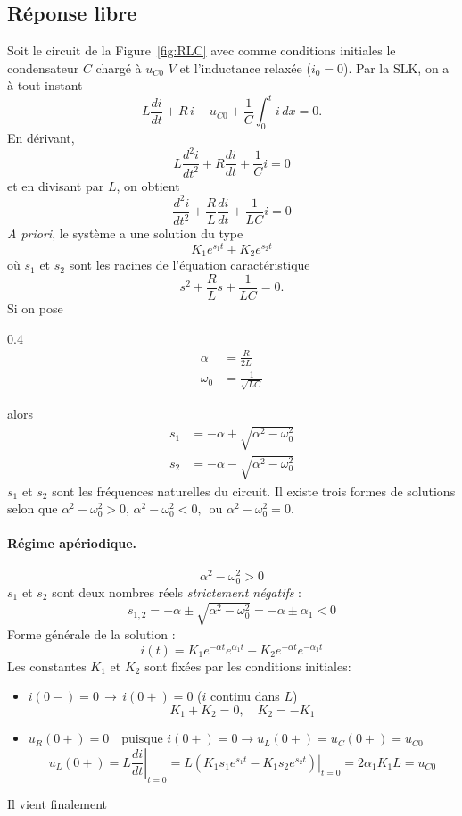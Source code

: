 \subsection{Réponse libre}
\begin{marginfigure}
	\centering
	
	\caption{Circuit RLC série.} \label{fig:RLC}
\end{marginfigure}
Soit le circuit de la Figure~\ref{fig:RLC} avec comme conditions initiales le condensateur $C$ chargé à $u_{C0}$ $V$ et l'inductance relaxée ($i_0 = 0$). Par la SLK, on a à tout instant
\[L\frac{di}{dt}+R\, i-u_{C0}+\frac{1}{C}\int_0^t i\, dx = 0.\]
En dérivant, 
$$L\frac{d^2i}{dt^2}+R\frac{di}{dt}+\frac{1}{C} i = 0$$
et en divisant par $L$, on obtient 
$$\frac{d^2i}{dt^2}+\frac{R}{L}\frac{di}{dt}+\frac{1}{LC} i = 0$$
\textit{A priori}, le système a une solution du type 
\[K_1e^{s_1 t}+K_2e^{s_2 t}\]
où $s_1$ et $s_2$ sont les racines de l'équation caractéristique
\[s^2 + \frac{R}{L} s + \frac{1}{LC} = 0.\]
Si on pose
\begin{center}
\begin{boxedminipage}{0.4\linewidth}
	\begin{align*}
	\alpha & =  \frac{R}{2L}\\
	\omega_0 & =  \frac{1}{\sqrt{LC}}
	\end{align*}
\end{boxedminipage}
\end{center}
alors
\begin{align*}
s_1 &= -\alpha + \sqrt{\alpha^2 - \omega_0^2}\\
s_2 & =  -\alpha - \sqrt{\alpha^2 - \omega_0^2}
\end{align*}
$s_1$ et $s_2$ sont les fréquences naturelles du circuit.
Il existe trois formes de solutions selon que $\alpha^2 - \omega_0^2 > 0,  \, \alpha^2 - \omega_0^2 < 0, \,\text{ ou } \alpha^2 - \omega_0^2= 0$.


\paragraph{Régime apériodique.} 
$$\alpha^2 - \omega_0^2 > 0 $$
$s_1$ et $s_2$ sont deux nombres réels {\em strictement négatifs} :
	{ \[s_{1,2}=-\alpha \pm \sqrt{\alpha^2-\omega_0^2}= -\alpha \pm \alpha_1 < 0\]}
	Forme générale de la solution :
	{\[i(t)=K_1 e^{-\alpha t}e^{\alpha_1 t} + K_2 e^{-\alpha t}e^{-\alpha_1 t}\]}
	Les constantes $K_1$ et $K_2$ sont fixées par les conditions initiales:
	\begin{itemize}
		\item {$i(0-)=0\, \rightarrow \, i(0+)=0$ ($i$ continu dans $L$)
			\[K_1+K_2=0, \quad K_2=-K_1\]}
		\item {$u_R(0+)=0 \quad \text{puisque~} i(0+)=0 \rightarrow u_L(0+)=u_C(0+)=u_{C0}$
			\[u_L(0+)=\left.L\frac{di}{dt}\right|_{t=0}=\left.L(K_1s_1e^{s_1t}-K_1s_2e^{s_2t})\right|_{t=0}
			=2\alpha_1K_1L=u_{C0}\]}
	\end{itemize}
	Il vient finalement 
	\begin{center}
	\end{center}
	
